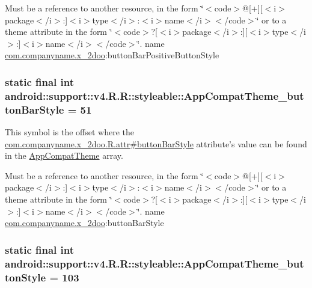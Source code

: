 Must be a reference to another resource, in the form \char`\"{}$<$code$>$@\mbox{[}+\mbox{]}\mbox{[}$<$i$>$package$<$/i$>$:\mbox{]}$<$i$>$type$<$/i$>$:$<$i$>$name$<$/i$>$$<$/code$>$\char`\"{} or to a theme attribute in the form \char`\"{}$<$code$>$?\mbox{[}$<$i$>$package$<$/i$>$:\mbox{]}\mbox{[}$<$i$>$type$<$/i$>$:\mbox{]}$<$i$>$name$<$/i$>$$<$/code$>$\char`\"{}.  name \hyperlink{namespacecom_1_1companyname_1_1x__2doo}{com.companyname.x\_\-2doo}:buttonBarPositiveButtonStyle \hypertarget{classandroid_1_1support_1_1v4_1_1_r_1_1styleable_f62e556ecad9de84a7a256eb8b485488}{
\subsubsection[{AppCompatTheme\_\-buttonBarStyle}]{\setlength{\rightskip}{0pt plus 5cm}static final int android::support::v4.R.R::styleable::AppCompatTheme\_\-buttonBarStyle = 51}}
\label{classandroid_1_1support_1_1v4_1_1_r_1_1styleable_f62e556ecad9de84a7a256eb8b485488}


This symbol is the offset where the \hyperlink{classcom_1_1companyname_1_1x__2doo_1_1_r_1_1attr_88e4aa5a715ecf555b65b28bce9589f5}{com.companyname.x\_\-2doo.R.attr\#buttonBarStyle} attribute's value can be found in the \hyperlink{classandroid_1_1support_1_1v4_1_1_r_1_1styleable_0873e92ba21076bb5a4aeadeb7f5779f}{AppCompatTheme} array.

Must be a reference to another resource, in the form \char`\"{}$<$code$>$@\mbox{[}+\mbox{]}\mbox{[}$<$i$>$package$<$/i$>$:\mbox{]}$<$i$>$type$<$/i$>$:$<$i$>$name$<$/i$>$$<$/code$>$\char`\"{} or to a theme attribute in the form \char`\"{}$<$code$>$?\mbox{[}$<$i$>$package$<$/i$>$:\mbox{]}\mbox{[}$<$i$>$type$<$/i$>$:\mbox{]}$<$i$>$name$<$/i$>$$<$/code$>$\char`\"{}.  name \hyperlink{namespacecom_1_1companyname_1_1x__2doo}{com.companyname.x\_\-2doo}:buttonBarStyle \hypertarget{classandroid_1_1support_1_1v4_1_1_r_1_1styleable_a567eb6928ba9055a784ae2ad69d63f8}{
\subsubsection[{AppCompatTheme\_\-buttonStyle}]{\setlength{\rightskip}{0pt plus 5cm}static final int android::support::v4.R.R::styleable::AppCompatTheme\_\-buttonStyle = 103}}
\label{classandroid_1_1support_1_1v4_1_1_r_1_1styleable_a567eb6928ba9055a784ae2ad69d63f8}


